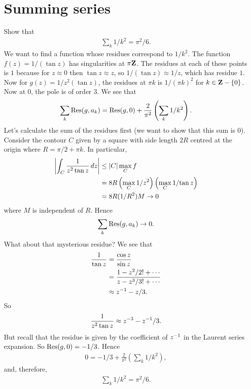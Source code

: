 \documentclass[11pt, oneside,margin=1in]{article}
\begin{document}
\section{Summing series}
\begin{example}\label{}\text{}
Show that
\begin{align*}
	\sum_k 1/k^2 = \pi^2/6.
\end{align*}
We want to find a function whose residues correspond to $1/k^2$. The function $f(z) = 1/ (\tan z)$ has singularities at $\pi \mathbf Z$. The residues at each of these points is $1$ because for $z\approx 0$ then $\tan z \approx z$, so $1/(\tan z)\approx 1/z$, which has residue $1$. Now for $g(z) = 1/z^2 (\tan z)$, the residues at $\pi k$ is $1/(\pi k)^2$ for $k \in \mathbf Z- \{0\}$. Now at $0$, the pole is of order $3$. We see that
\begin{align*}
	\sum_k \operatorname{Res}(g,a_k) = \operatorname{Res}(g,0) + \frac{2}{\pi^2} \left( \sum_k 1/k^2 \right).
\end{align*}
Let's calculate the sum of the residues first (we want to show that this sum is $0$). Consider the contour $C$ given by a square with side length $2R$ centred at the origin where $R = \pi/2 + \pi k$. In particular, 
 \begin{align*}
	 \left \lvert \int_C \frac{1}{z^2\tan z} \, dz \right \rvert &\le \left \lvert C \right \rvert \max_C f\\
						&= 8R\left (\max_C {1}/{z^2}\right) \left(\max_C {1}/{\tan z}\right)\\
						&= 8R(1/R^2)M \to 0
\end{align*}
where $M$ is independent of $R$. Hence
\begin{align*}
	\sum_{k} \operatorname{Res}(g,a_k) \to 0.
\end{align*}
What about that mysterious residue? We see that
\begin{align*}
	\frac{1}{\tan z} &= \frac{\cos z}{\sin z}\\ &= \frac{ 1 - z^2/2! + \cdots}{z - z^3/3! + \cdots}\\
			 &\approx z^{-1} - z/3.
\end{align*}
So 
\begin{align*}
	\frac{1}{z^2\tan z} \approx z^{-3} - z^{-1} / 3.
\end{align*}
But recall that the residue is given by the coefficient of $z^{-1}$ in the Laurent series expansion. So $\operatorname{Res} (g,0) = -1/3$. Hence
\begin{align*}
	0 = -1/3 + \frac{2}{\pi^2} \left(\sum_k 1/k^2\right),
\end{align*}
and, therefore,
\begin{align*}
	\sum_k 1/k^2 = \pi^2/6.
\end{align*}
\end{example}
\end{document}
